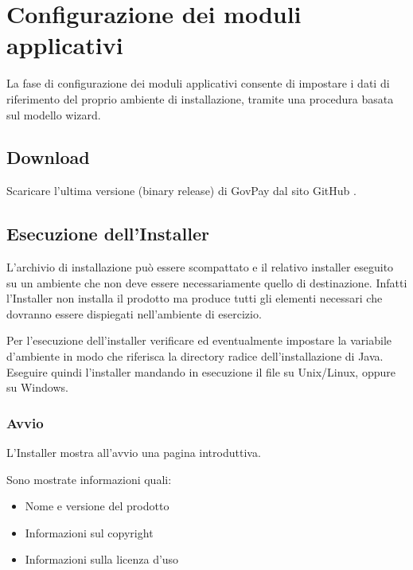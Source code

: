 \documentclass[letterpaper,10pt,italian]{sphinxmanual}
\begin{document}
\chapter{Configurazione dei moduli applicativi}
\label{\detokenize{configurazione/index:configurazione-dei-moduli-applicativi}}\label{\detokenize{configurazione/index:inst-configurazione}}\label{\detokenize{configurazione/index::doc}}
La fase di configurazione dei moduli applicativi consente di impostare i
dati di riferimento del proprio ambiente di installazione, tramite una
procedura basata sul modello wizard.


\section{Download}
\label{\detokenize{configurazione/index:download}}
Scaricare l’ultima versione (binary release) di GovPay dal sito GitHub
.


\section{Esecuzione dell’Installer}
\label{\detokenize{configurazione/index:esecuzione-dell-installer}}
L’archivio di installazione può essere scompattato e il relativo
installer eseguito su un ambiente che non deve essere necessariamente
quello di destinazione. Infatti l’Installer non installa il prodotto ma
produce tutti gli elementi necessari che dovranno essere dispiegati
nell’ambiente di esercizio.

Per l’esecuzione dell’installer verificare ed eventualmente impostare la
variabile d’ambiente  in modo che riferisca la directory
radice dell’installazione di Java. Eseguire quindi l’installer mandando
in esecuzione il file  su Unix/Linux, oppure
 su Windows.


\subsection{Avvio}
\label{\detokenize{configurazione/index:avvio}}
L’Installer mostra all’avvio una pagina introduttiva.

Sono mostrate informazioni quali:
\begin{itemize}
\item {} 
Nome e versione del prodotto

\item {} 
Informazioni sul copyright

\item {} 
Informazioni sulla licenza d’uso

\end{itemize}
\end{document}
